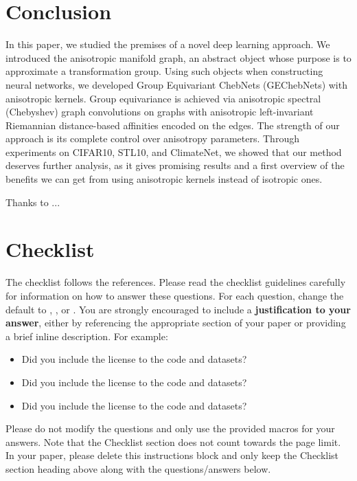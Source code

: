 \documentclass{article}
\begin{document}
\section{Conclusion} \label{sec:conclusion}

In this paper, we studied the premises of a novel deep learning approach. We introduced the anisotropic manifold graph, an abstract object whose purpose is to approximate a transformation group. Using such objects when constructing neural networks, we developed Group Equivariant ChebNets (GEChebNets) with anisotropic kernels. Group equivariance is achieved via anisotropic spectral (Chebyshev) graph convolutions on graphs with anisotropic left-invariant Riemannian distance-based affinities encoded on the edges. The strength of our approach is its complete control over anisotropy parameters. Through experiments on CIFAR10, STL10, and ClimateNet, we showed that our method deserves further analysis, as it gives promising results and a first overview of the benefits we can get from using anisotropic kernels instead of isotropic ones.


\begin{ack}
Thanks to ...
\end{ack}

\clearpage



\clearpage
\section*{Checklist}

The checklist follows the references.  Please
read the checklist guidelines carefully for information on how to answer these
questions.  For each question, change the default \answerTODO{} to \answerYes{},
\answerNo{}, or \answerNA{}.  You are strongly encouraged to include a {\bf
justification to your answer}, either by referencing the appropriate section of
your paper or providing a brief inline description.  For example:
\begin{itemize}
  \item Did you include the license to the code and datasets? 
  \item Did you include the license to the code and datasets? 
  \item Did you include the license to the code and datasets? \answerNA{}
\end{itemize}
Please do not modify the questions and only use the provided macros for your
answers.  Note that the Checklist section does not count towards the page
limit.  In your paper, please delete this instructions block and only keep the
Checklist section heading above along with the questions/answers below.
\end{document}
